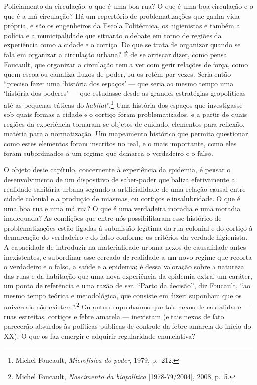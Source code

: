 Policiamento da circulação: o que é uma boa rua? O que é uma boa
circulação e o que é a má circulação? Há um repertório de
problematizações que ganha vida própria, e são os engenheiros da Escola
Politécnica, os higienistas e também a polícia e a municipalidade que
situarão o debate em torno de regiões da experiência como a cidade e o
cortiço. Do que se trata de organizar quando se fala em organizar a
circulação urbana? É de se arriscar dizer, como pensa Foucault, que
organizar a circulação tem a ver com gerir relações de força, como quem
escoa ou canaliza fluxos de poder, ou os retém por vezes. Seria então
``preciso fazer uma `história dos espaços' --- que seria ao mesmo tempo
uma `história dos poderes' --- que estudasse desde as grandes estratégias
geopolíticas até as pequenas táticas do \textit{habitat}''.\footnote{Michel
  Foucault, \textit{Microfísica do poder}, 1979, p.~212.} Uma história dos
espaços que investigasse sob quais formas a cidade e o cortiço foram
problematizados, e a partir de quais regiões da experiência tornaram-se
objetos de cuidado, elementos para reflexão, matéria para a
normatização. Um mapeamento histórico que permita questionar como estes
elementos foram inscritos no real, e o mais importante, como eles foram
subordinados a um regime que demarca o verdadeiro e o falso.

O objeto deste capítulo, concernente à experiência da epidemia, é pensar
o desenvolvimento de um dispositivo de saber-poder que baliza
efetivamente a realidade sanitária urbana segundo a artificialidade de
uma relação causal entre cidade colonial e a produção de miasmas, ou
cortiços e insalubridade. O que é uma boa rua e uma má rua? O que é uma
verdadeira moradia e uma moradia inadequada? As condições que entre nós
possibilitaram esse histórico de problematizações estão ligadas à
submissão legítima da rua colonial e do cortiço à demarcação do
verdadeiro e do falso conforme os critérios da verdade higienista. A
capacidade de introduzir na materialidade urbana nexos de causalidade
antes inexistentes, e subordinar esse cercado de realidade a um novo
regime que recorta o verdadeiro e o falso, a saúde e a epidemia; é dessa
valoração sobre a natureza das ruas e da habitação que uma nova
experiência da epidemia extrai um caráter, um ponto de referência e uma
razão de ser. ``Parto da decisão'', diz Foucault, ``ao mesmo tempo
teórica e metodológica, que consiste em dizer: suponham que os
universais não existem''.\footnote{Michel Foucault, \textit{Nascimento da
  biopolítica} {[}1978-79/2004{]}, 2008, p.~5.} Ou antes: suponhamos que
tais nexos de causalidade --- ruas estreitas, cortiços e febre amarela ---
inexistam (e tais nexos de fato parecerão absurdos às políticas públicas
de controle da febre amarela do início do XX). O que os faz emergir e
adquirir regularidade enunciativa?

